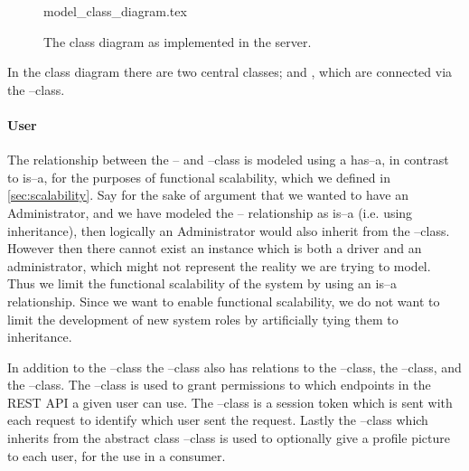 \begin{figure}[p]
    \begin{center}
        {model_class_diagram.tex}
        \caption{The class diagram as implemented in the server.}\label{fig:model_class_diagram}
    \end{center}
\end{figure}

In the class diagram there are two central classes;  and , which are connected via the --class.
\paragraph*{User}
The relationship between the -- and --class is modeled using a has--a, in contrast to is--a, for the purposes of functional scalability, which we defined in \cref{sec:scalability}.
Say for the sake of argument that we wanted to have an Administrator, and we have modeled the -- relationship as is--a (i.e. using inheritance), 
then logically an Administrator would also inherit from the --class.
However then there cannot exist an instance which is both a driver and an administrator, which might not represent the reality we are trying to model. 
Thus we limit the functional scalability of the system by using an is--a relationship. 
Since we want to enable functional scalability, we do not want to limit the development of new system roles by artificially tying them to inheritance.

In addition to the --class the --class also has relations to the --class, the --class, and the --class.
The --class is used to grant permissions to which endpoints in the REST API a given user can use. 
The --class is a session token which is sent with each request to identify which user sent the request. 
Lastly the --class which inherits from the abstract class --class is used to optionally give a profile picture to each user, for the use in a consumer. 

